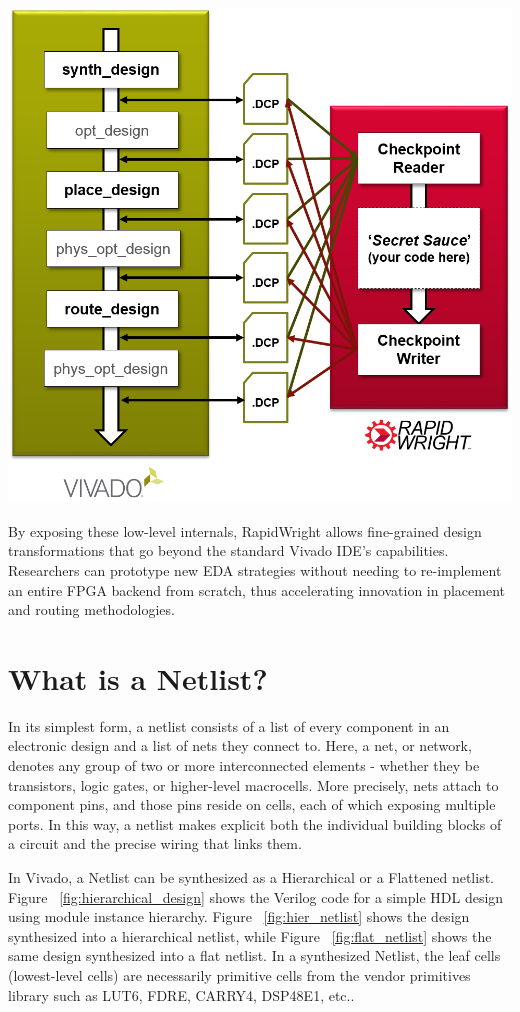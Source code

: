 \documentclass{article}
\begin{document}
\begin{multicols}{2}
    {
        \centering
        \includegraphics[width=0.8\columnwidth]{figures/vivado_dcps.png}
        \label{fig:vivado_dcps}
    }

    By exposing these low-level internals, RapidWright allows fine-grained design transformations that go beyond the standard Vivado IDE’s capabilities. 
    Researchers can prototype new EDA strategies without needing to re-implement an entire FPGA backend from scratch, thus accelerating innovation in placement and routing methodologies.

\newpage
\section{What is a Netlist?}
    \label{sec:netlist}
    In its simplest form, a netlist consists of a list of every component in an electronic design and a list of nets they connect to. 
    Here, a net, or network, denotes any group of two or more interconnected elements - whether they be transistors, logic gates, or higher-level macrocells. 
    More precisely, nets attach to component pins, and those pins reside on cells, each of which exposing multiple ports. 
    In this way, a netlist makes explicit both the individual building blocks of a circuit and the precise wiring that links them. 

    In Vivado, a Netlist can be synthesized as a Hierarchical or a Flattened netlist. 
    Figure ~\ref{fig:hierarchical_design} shows the Verilog code for a simple HDL design using module instance hierarchy. 
    Figure ~\ref{fig:hier_netlist} shows the design synthesized into a hierarchical netlist, while Figure ~\ref{fig:flat_netlist} shows the same design synthesized into a flat netlist. 
    In a synthesized Netlist, the leaf cells (lowest-level cells) are necessarily primitive cells from the vendor primitives library such as LUT6, FDRE, CARRY4, DSP48E1, etc.. 

    \end{multicols}
\end{document}
